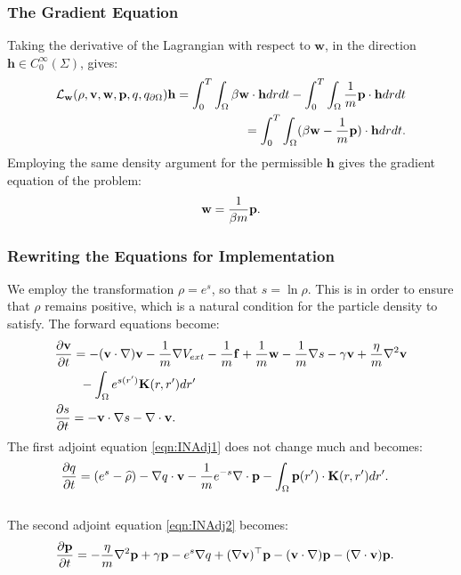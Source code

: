 \subsubsection{The Gradient Equation}
Taking the derivative of the Lagrangian with respect to $\mathbf{w}$, in the direction $\mathbf{h} \in C_0^\infty(\Sigma)$, gives:
\begin{align*}
\mathcal{L}_{\mathbf{w}}(\rho,\mathbf{v},\mathbf{w},\mathbf{p},q,{q}_{\partial \Omega}) \mathbf{h}= \int_0^T \int_\Omega \beta \mathbf{w} \cdot \mathbf{h} dr dt - \int_0^T \int_\Omega \frac{1}{m} \mathbf{p} \cdot \mathbf{h} dr dt \\
= \int_0^T \int_\Omega ( \beta \mathbf{w} - \frac{1}{m}\mathbf{p}) \cdot \mathbf{h} dr dt.
\end{align*}
Employing the same density argument for the permissible $\mathbf{h}$ gives the gradient equation of the problem:
\begin{align*}
 \mathbf{w} = \frac{1}{\beta m} \mathbf{p}.
\end{align*}

\subsubsection{Rewriting the Equations for Implementation} \label{sec:INImplementation}
We employ the transformation $\rho = e^s$, so that $s = \ln \rho$. This is in order to ensure that $\rho$ remains positive, which is a natural condition for the particle density to satisfy. 
The forward equations become:
\begin{align*}
& \frac{\partial \Stav}{\partial t}= -  (\Stav \cdot \nabla)\Stav - \frac{1}{m} \nabla V_{ext} -\frac{1}{m}\Con +\frac{1}{m} \mathbf{w} - \frac{1}{m} \nabla s - \gamma \Stav +  \frac{\eta}{m} \nabla^2 \Stav\\ %
&\quad \quad  -\int_\Omega e^{s(r')} \mathbf{K}(r,r')dr' \notag\\
 &\frac{\partial s}{\partial t} = - \Stav \cdot \nabla s - \nabla \cdot \Stav. %
\end{align*}
The first adjoint equation \eqref{eqn:INAdj1} does not change much and becomes:
\begin{align*}
&  \frac{\partial q}{\partial t}  = (e^s - \widehat {\rho})- \nabla q \cdot \mathbf{v}-\frac{1}{m} e^{-s}\nabla \cdot \mathbf{p}-  \int_\Omega  \mathbf{p}(r') \cdot\mathbf{K}(r,r')   dr' .
\end{align*}
\\
The second adjoint equation \eqref{eqn:INAdj2} becomes:
\begin{align*}
&\frac{\partial \mathbf{p}}{\partial t} =  - \frac{\eta}{m} \nabla^2 \mathbf{p}  + \gamma\mathbf{p}-e^s\nabla q +(\nabla \mathbf{v})^\top\mathbf{p} 
- (\mathbf{v} \cdot \nabla)\mathbf{p} -  (\nabla \cdot \mathbf{v})\mathbf{p}   .
\end{align*}

